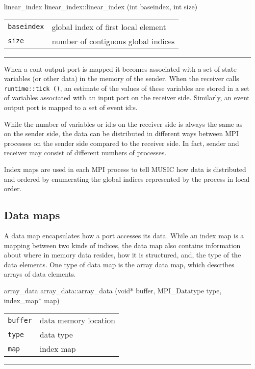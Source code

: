 \documentclass[a4paper]{report}
\makeatletter
\newenvironment{parameters}%
{\begin{tabular}{@{\hspace{2em}}lp{0.6\textwidth}}}%
{\end{tabular}\par\vspace{1mm}\par\hrule\par\vspace{5mm}}
\makeatother
\begin{document}
\begin{head}{linear_index}
  linear_index::linear_index (int baseindex, int size)
\end{head}
\begin{parameters}
  \lstinline|baseindex| & global index of first local element \\
  \lstinline|size| & number of contiguous global indices \\
\end{parameters}

When a cont output port is mapped it becomes associated with a set of
state variables (or other data) in the memory of the sender.  When the
receiver calls \lstinline|runtime::tick ()|, an estimate of the values
of these variables are stored in a set of variables associated with an
input port on the receiver side.  Similarly, an event output port is
mapped to a set of event id:s.

While the number of variables or id:s on the receiver side is always
the same as on the sender side, the data can be distributed in
different ways between MPI processes on the sender side compared to
the receiver side.  In fact, sender and receiver may consist of
different numbers of processes.

Index maps are used in each MPI process to tell MUSIC how data is
distributed and ordered by enumerating the global indices represented
by the process in local order.

\subsection{Data maps}
\label{sec:datamap}

A data map encapsulates how a port accesses its data.  While an index
map is a mapping between two kinds of indices, the data map also
contains information about where in memory data resides, how it is
structured, and, the type of the data elements.  One type of data map
is the array data map, which describes arrays of data elements.

\begin{head}{array_data}
  array_data::array_data (void* buffer, MPI_Datatype type, index_map* map)
\end{head}
\begin{parameters}
  \lstinline|buffer| & data memory location \\
  \lstinline|type|   & data type \\
  \lstinline|map|    & index map \\
\end{parameters}
\end{document}
